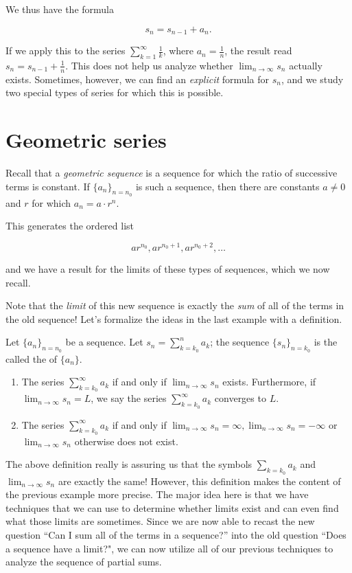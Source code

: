 \documentclass{ximera}
\begin{document}
We thus have the formula 

\[
s_n = s_{n-1}+a_n.
\]

If we apply this to the series $\sum_{k=1}^{\infty} \frac{1}{k}$, where $a_n = \frac{1}{n}$, the result read $s_n = s_{n-1} + \frac{1}{n}$.  This does not help us analyze whether $\lim_{n \to \infty} s_n$ actually exists.  Sometimes, however, we can find an \emph{explicit} formula for $s_n$, and we study two special types of series for which this is possible.

\section{Geometric series}
Recall that a \emph{geometric sequence} is a sequence for which the ratio of successive terms is constant.  If $\{a_n\}_{n=n_0}$ is such a sequence, then there are constants $a \ne 0$ and $r$ for which $a_n = a\cdot r^n$.  

This generates the ordered list

\[
ar^{n_0} , ar^{n_0+1}, ar^{n_0+2}, \ldots
\]


and we have a result for the limits of these types of sequences, which we now recall.

Note that the \emph{limit} of this new sequence is exactly the \emph{sum} of all of the terms in the old sequence!  Let's formalize the ideas in the last example with a definition.

\begin{definition}
Let $\{a_n\}_{n=n_0}$ be a sequence.  Let $s_n = \sum_{k=k_0}^n a_k$; the sequence $\{s_n\}_{n=k_0}$ is the called the
   of $\{a_n\}$.  

\begin{enumerate}
\item The series $\sum_{k=k_0}^\infty a_k$  if and only if $\lim_{n\to\infty} s_n$ exists.  Furthermore, if $\lim_{n\to\infty} s_n =L$, we say the series $\sum_{k=k_0}^\infty a_k$ converges to $L$. 
\item The series $\sum_{k=k_0}^\infty a_k$  if and only if $\lim_{n\to\infty} s_n = \infty, \lim_{n\to\infty} s_n = -\infty$ or $\lim_{n\to\infty} s_n $ otherwise does not exist.  
\end{enumerate}
\end{definition}

The above definition really is assuring us that the symbols $\sum_{k=k_0} a_k$ and $\lim_{n \to \infty} s_n$ are exactly the same! However, this definition makes the content of the previous example more precise.  The major idea here is that we have techniques that we can use to determine whether limits exist and can even find what those limits are sometimes.  Since we are now able to recast the new question ``Can I sum all of the terms in a sequence?'' into the old question ``Does a sequence have a limit?", we can now utilize all of our previous techniques to analyze the sequence of partial sums.
\end{document}
